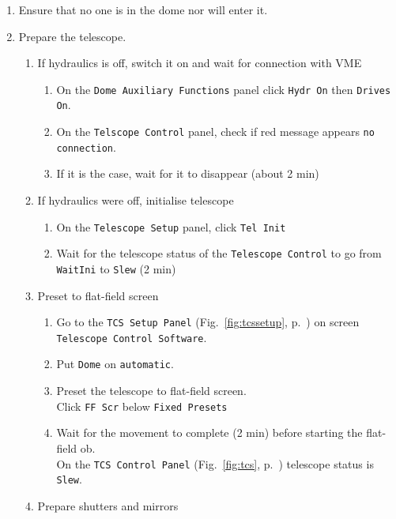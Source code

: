 \documentclass[11pt,fleqn]{book}
\def\figref#1{Fig.~\ref{fig:#1}, p.~\pageref{fig:#1}}
\begin{document}
   \begin{enumerate}
     \item Ensure that no one is in the dome nor will enter it.
     \item Prepare the telescope.
         \begin{enumerate}
            \item If hydraulics is off, switch it on and wait for connection with VME
                \begin{enumerate}
                    \item On the \texttt{Dome Auxiliary Functions} panel click \texttt{Hydr On} then \texttt{Drives On}.
                    \item On the \texttt{Telscope Control} panel, check if red message appears  \texttt{no connection}.
                    \item If it is the case, wait for it to disappear (about 2 min)
                \end{enumerate}
            \item If hydraulics were off, initialise telescope
                \begin{enumerate}
                    \item On the \texttt{Telescope Setup} panel, click \texttt{Tel Init}
                    \item Wait for the telescope status of  the \texttt{Telescope Control} to go from \texttt{WaitIni} to \texttt{Slew} (2 min)
                \end{enumerate}
            \item Preset to flat-field screen
            \begin{enumerate}
                \item Go to the \texttt{TCS Setup Panel} (\figref{tcssetup}) on screen \texttt{Telescope Control Software}.
                \item Put \texttt{Dome} on \texttt{automatic}.
                \item Preset the telescope to flat-field screen.\\
                  Click \texttt{FF Scr} below \texttt{Fixed Presets}
                \item Wait for the movement to complete (2 min) before starting the flat-field \gls{ob}.\\
                  On the \texttt{TCS Control Panel} (\figref{tcs}) telescope status is \texttt{Slew}.
            \end{enumerate}
            \item Prepare shutters and mirrors

\end{enumerate}
\end{enumerate}
\end{document}
